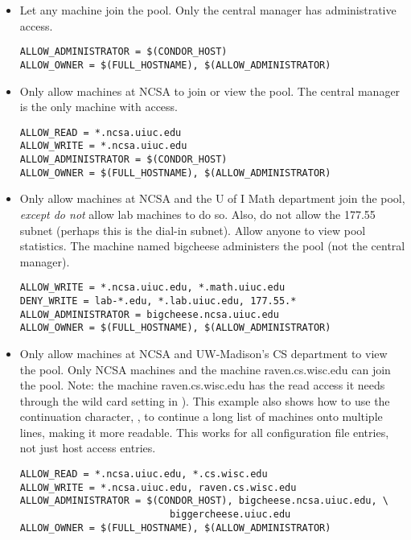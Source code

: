 \begin{itemize}

\item Let any machine join the pool.
Only the central manager has
administrative access.
\footnotesize
\begin{verbatim}
ALLOW_ADMINISTRATOR = $(CONDOR_HOST)
ALLOW_OWNER = $(FULL_HOSTNAME), $(ALLOW_ADMINISTRATOR)
\end{verbatim}
\normalsize

\item Only allow machines at NCSA to join or view the pool.
The central manager is the only machine with  access.
\footnotesize
\begin{verbatim}
ALLOW_READ = *.ncsa.uiuc.edu
ALLOW_WRITE = *.ncsa.uiuc.edu
ALLOW_ADMINISTRATOR = $(CONDOR_HOST)
ALLOW_OWNER = $(FULL_HOSTNAME), $(ALLOW_ADMINISTRATOR)
\end{verbatim}
\normalsize

\item Only allow machines at NCSA and the U of I Math department join the
pool, \emph{except do not} allow lab machines to do so.
Also, do not
allow the 177.55 subnet (perhaps this is the dial-in subnet).
Allow anyone to view pool statistics.  The machine named
bigcheese administers the pool (not the central manager).
\footnotesize
\begin{verbatim}
ALLOW_WRITE = *.ncsa.uiuc.edu, *.math.uiuc.edu
DENY_WRITE = lab-*.edu, *.lab.uiuc.edu, 177.55.*
ALLOW_ADMINISTRATOR = bigcheese.ncsa.uiuc.edu
ALLOW_OWNER = $(FULL_HOSTNAME), $(ALLOW_ADMINISTRATOR)
\end{verbatim}
\normalsize

\item Only allow machines at NCSA and UW-Madison's CS department to
view the pool.  Only NCSA machines and the machine raven.cs.wisc.edu can join
the pool.
Note: the machine raven.cs.wisc.edu has the read access it needs through the
wild card setting in ).
This example also shows
how to use the continuation character, \verb@\@, to continue a long list of 
machines onto multiple lines, making it more readable.
This works for all configuration file entries, not just host access entries.
\footnotesize
\begin{verbatim}
ALLOW_READ = *.ncsa.uiuc.edu, *.cs.wisc.edu
ALLOW_WRITE = *.ncsa.uiuc.edu, raven.cs.wisc.edu
ALLOW_ADMINISTRATOR = $(CONDOR_HOST), bigcheese.ncsa.uiuc.edu, \
                          biggercheese.uiuc.edu
ALLOW_OWNER = $(FULL_HOSTNAME), $(ALLOW_ADMINISTRATOR)
\end{verbatim}
\normalsize


\end{itemize}
